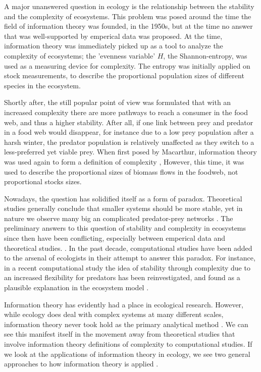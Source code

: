 \documentclass[../main.tex]{subfiles}
\begin{document}
A major unanswered question in ecology is the relationship between the stability and the complexity of ecosystems.
This problem was posed around the time the field of information theory was founded, in the 1950s, but at the time no answer that was well-supported by emperical data was proposed.
At the time, information theory was immediately picked up as a tool to analyze the complexity of ecosystems; the 'evenness variable' $H$, the Shannon-entropy, was used as a measuring device for complexity.
The entropy was initially applied on stock measurements, to describe the proportional population sizes of different species in the ecosystem.

Shortly after, the still popular point of view was formulated that with an increased complexity there are more pathways to reach a consumer in the food web, and thus a higher stability.
After all, if one link between prey and predator in a food web would disappear, for instance due to a low prey population after a harsh winter, the predator population is relatively unaffected as they switch to a less-preferred yet viable prey.
When first posed by Macarthur, information theory was used again to form a definition of complexity \cite{macarthur1955fluctuations},
However, this time, it was used to describe the proportional sizes of biomass flows in the foodweb, not proportional stocks sizes.

Nowadays, the question has solidified itself as a form of paradox.
Theoretical studies generally conclude that smaller systems should be more stable, yet in nature we observe many big an complicated predator-prey networks \cite{kondoh2003foraging}.
The preliminary answers to this question of stability and complexity in ecosystems since then have been conflicting, especially between emperical data and theoretical studies. \cite{pimm1984complexity}.
In the past decade, computational studies have been added to the arsenal of ecologists in their attempt to answer this paradox.
For instance, in a recent computational study the idea of stability through complexity due to an increased flexibility for predators has been reinvestigated, and found as a plausible explanation in the ecosystem model \cite{kondoh2003foraging}.

Information theory has evidently had a place in ecological research.
However, while ecology does deal with complex systems at many different scales, information theory never took hold as the primary analytical method \cite{ulanowicz2001information}. %
We can see this manifest itself in the movement away from theoretical studies that involve information theory definitions of complexity to computational studies.
If we look at the applications of information theory in ecology, we see two general approaches to how information theory is applied \cite{ulanowicz2001information}.
\end{document}
